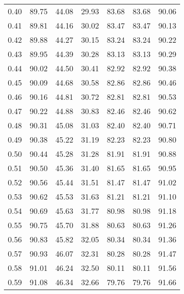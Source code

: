 \begin{tabular}{|c|c|c|c|c|c|c|}
      0.40 &     89.75 &     44.08 &      29.93 &   83.68 &      83.68 &         90.06 \\
      0.41 &     89.81 &     44.16 &      30.02 &   83.47 &      83.47 &         90.13 \\
      0.42 &     89.88 &     44.27 &      30.15 &   83.24 &      83.24 &         90.22 \\
      0.43 &     89.95 &     44.39 &      30.28 &   83.13 &      83.13 &         90.29 \\
      0.44 &     90.02 &     44.50 &      30.41 &   82.92 &      82.92 &         90.38 \\
      0.45 &     90.09 &     44.68 &      30.58 &   82.86 &      82.86 &         90.46 \\
      0.46 &     90.16 &     44.81 &      30.72 &   82.81 &      82.81 &         90.53 \\
      0.47 &     90.22 &     44.88 &      30.83 &   82.46 &      82.46 &         90.62 \\
      0.48 &     90.31 &     45.08 &      31.03 &   82.40 &      82.40 &         90.71 \\
      0.49 &     90.38 &     45.22 &      31.19 &   82.23 &      82.23 &         90.80 \\
      0.50 &     90.44 &     45.28 &      31.28 &   81.91 &      81.91 &         90.88 \\
      0.51 &     90.50 &     45.36 &      31.40 &   81.65 &      81.65 &         90.95 \\
      0.52 &     90.56 &     45.44 &      31.51 &   81.47 &      81.47 &         91.02 \\
      0.53 &     90.62 &     45.53 &      31.63 &   81.21 &      81.21 &         91.10 \\
      0.54 &     90.69 &     45.63 &      31.77 &   80.98 &      80.98 &         91.18 \\
      0.55 &     90.75 &     45.70 &      31.88 &   80.63 &      80.63 &         91.26 \\
      0.56 &     90.83 &     45.82 &      32.05 &   80.34 &      80.34 &         91.36 \\
      0.57 &     90.93 &     46.07 &      32.31 &   80.28 &      80.28 &         91.47 \\
      0.58 &     91.01 &     46.24 &      32.50 &   80.11 &      80.11 &         91.56 \\
      0.59 &     91.08 &     46.34 &      32.66 &   79.76 &      79.76 &         91.66 \\

\end{tabular}
